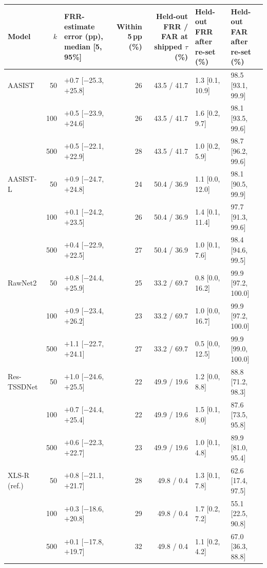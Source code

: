 \begin{tabular}{@{}lrlrrll@{}}
\toprule
Model & $k$ & FRR-estimate error (pp), median [5, 95\%] & Within 5\,pp (\%) & Held-out FRR / FAR at shipped $\tau$ (\%) & Held-out FRR after re-set (\%) & Held-out FAR after re-set (\%) \\
\midrule
AASIST & 50 & $+$0.7 [$-$25.3, $+$25.8] & 26 & 43.5 / 41.7 & 1.3 [0.1, 10.9] & 98.5 [93.1, 99.9] \\
 & 100 & $+$0.5 [$-$23.9, $+$24.6] & 26 & 43.5 / 41.7 & 1.6 [0.2, 9.7] & 98.1 [93.5, 99.6] \\
 & 500 & $+$0.5 [$-$22.1, $+$22.9] & 28 & 43.5 / 41.7 & 1.0 [0.2, 5.9] & 98.7 [96.2, 99.6] \\
\midrule
AASIST-L & 50 & $+$0.9 [$-$24.7, $+$24.8] & 24 & 50.4 / 36.9 & 1.1 [0.0, 12.0] & 98.1 [90.5, 99.9] \\
 & 100 & $+$0.1 [$-$24.2, $+$23.5] & 26 & 50.4 / 36.9 & 1.4 [0.1, 11.4] & 97.7 [91.3, 99.6] \\
 & 500 & $+$0.4 [$-$22.9, $+$22.5] & 27 & 50.4 / 36.9 & 1.0 [0.1, 7.6] & 98.4 [94.6, 99.5] \\
\midrule
RawNet2 & 50 & $+$0.8 [$-$24.4, $+$25.9] & 25 & 33.2 / 69.7 & 0.8 [0.0, 16.2] & 99.9 [97.2, 100.0] \\
 & 100 & $+$0.9 [$-$23.4, $+$26.2] & 23 & 33.2 / 69.7 & 1.0 [0.0, 16.7] & 99.9 [97.2, 100.0] \\
 & 500 & $+$1.1 [$-$22.7, $+$24.1] & 27 & 33.2 / 69.7 & 0.5 [0.0, 12.5] & 99.9 [99.0, 100.0] \\
\midrule
Res-TSSDNet & 50 & $+$1.0 [$-$24.6, $+$25.5] & 22 & 49.9 / 19.6 & 1.2 [0.0, 8.8] & 88.8 [71.2, 98.3] \\
 & 100 & $+$0.7 [$-$24.4, $+$25.4] & 22 & 49.9 / 19.6 & 1.5 [0.1, 8.0] & 87.6 [73.5, 95.8] \\
 & 500 & $+$0.6 [$-$22.3, $+$22.7] & 23 & 49.9 / 19.6 & 1.0 [0.1, 4.8] & 89.9 [81.0, 95.4] \\
\midrule
XLS-R (ref.) & 50 & $+$0.8 [$-$21.1, $+$21.7] & 28 & 49.8 / 0.4 & 1.3 [0.1, 7.8] & 62.6 [17.4, 97.5] \\
 & 100 & $+$0.3 [$-$18.6, $+$20.8] & 29 & 49.8 / 0.4 & 1.7 [0.2, 7.2] & 55.1 [22.5, 90.8] \\
 & 500 & $+$0.1 [$-$17.8, $+$19.7] & 32 & 49.8 / 0.4 & 1.1 [0.2, 4.2] & 67.0 [36.3, 88.8] \\
\bottomrule
\end{tabular}
